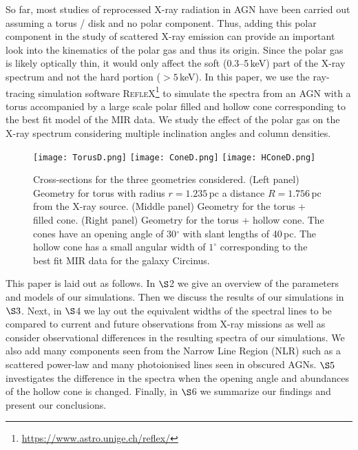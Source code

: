 \documentclass[fleqn,usenatbib]{mnras}
\begin{document}
    So far, most studies of reprocessed X-ray radiation in AGN have been carried out assuming a torus / disk and no polar component. Thus, adding this polar component in the study of scattered X-ray emission can provide an important look into the kinematics of the polar gas and thus its origin. Since the polar gas is likely optically thin, it would only affect the soft (0.3--5\,keV) part of the X-ray spectrum and not the hard portion ($>5$\,keV). In this paper, we use the ray-tracing simulation software \textsc{RefleX}\footnote{\url{https://www.astro.unige.ch/reflex/}} \citep{RefleX} to simulate the spectra from an AGN with a torus accompanied by a large scale polar filled and hollow cone corresponding to the best fit model of the MIR data. We study the effect of the polar gas on the X-ray spectrum considering multiple inclination angles and column densities.
    
    \begin{figure*}
        \centering
        \texttt{[image: TorusD.png]}
        \texttt{[image: ConeD.png]}
        \texttt{[image: HConeD.png]}
        \caption{Cross-sections for the three geometries considered. (Left panel) Geometry for torus with radius $r = 1.235$\,pc a distance $R = 1.756$\,pc from the X-ray source. (Middle panel) Geometry for the torus + filled cone. (Right panel) Geometry for the torus + hollow cone. The cones have an opening angle of 30$^{\circ}$ with slant lengths of 40\,pc. The hollow cone has a small angular width of $1^{\circ}$ corresponding to the best fit MIR data for the galaxy Circinus.}
        \label{fig1}
    \end{figure*}

    This paper is laid out as follows. In $\S$2 we give an overview of the parameters and models of our simulations. Then we discuss the results of our simulations in $\S3$. Next, in $\S$4 we lay out the equivalent widths of the spectral lines to be compared to current and future observations from X-ray missions as well as consider observational differences in the resulting spectra of our simulations. We also add many components seen from the Narrow Line Region (NLR) such as a scattered power-law and many photoionised lines seen in obscured AGNs. $\S5$ investigates the difference in the spectra when the opening angle and abundances of the hollow cone is changed. Finally, in $\S$6 we summarize our findings and present our conclusions. 
\end{document}
